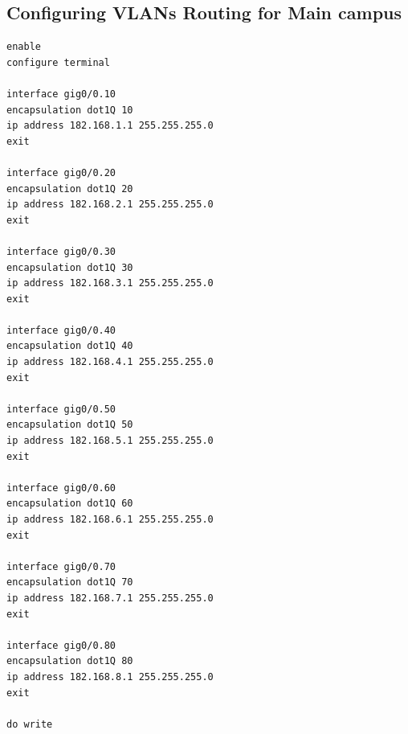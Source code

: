 \documentclass[12pt]{article}
\begin{document}
\subsection{Configuring VLANs Routing for Main campus }
\begin{verbatim}
enable
configure terminal

interface gig0/0.10
encapsulation dot1Q 10
ip address 182.168.1.1 255.255.255.0
exit

interface gig0/0.20
encapsulation dot1Q 20
ip address 182.168.2.1 255.255.255.0
exit

interface gig0/0.30
encapsulation dot1Q 30
ip address 182.168.3.1 255.255.255.0
exit

interface gig0/0.40
encapsulation dot1Q 40
ip address 182.168.4.1 255.255.255.0
exit

interface gig0/0.50
encapsulation dot1Q 50
ip address 182.168.5.1 255.255.255.0
exit

interface gig0/0.60
encapsulation dot1Q 60
ip address 182.168.6.1 255.255.255.0
exit

interface gig0/0.70
encapsulation dot1Q 70
ip address 182.168.7.1 255.255.255.0
exit

interface gig0/0.80
encapsulation dot1Q 80
ip address 182.168.8.1 255.255.255.0
exit

do write
\end{verbatim}
\end{document}
